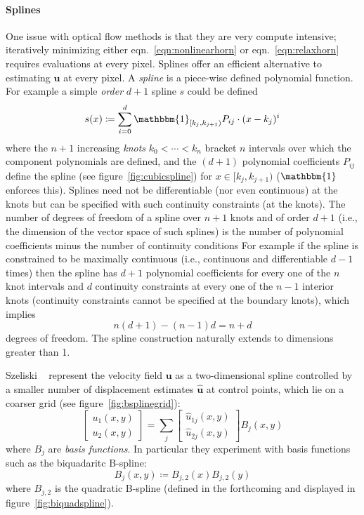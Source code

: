 \paragraph{Splines}

One issue with optical flow methods is that they are very compute intensive; iteratively minimizing either eqn.~\eqref{eqn:nonlinearhorn} or eqn.~\eqref{eqn:relaxhorn} requires evaluations at every pixel.
%
Splines offer an efficient alternative to estimating \(\mathbf{u}\) at every pixel.
%
A \textit{spline} is a piece-wise defined polynomial function. For example a simple \textit{order} \(d+1\) spline \(s\) could be defined
\[
		s(x) \coloneqq \sum_{i=0}^d \mathbbm{1}_{[k_j, k_{j+1})}P_{ij} \cdot (x - k_j)^i
\]
where the \(n+1\) increasing \textit{knots} \(k_0 < \cdots < k_n\) bracket \(n\) intervals over which the component polynomials are defined, and the \((d+1)\) polynomial coefficients \(P_{ij}\) define the spline (see figure~\ref{fig:cubicspline}) for \(x \in [k_j, k_{j+1})\) (\(\mathbbm{1}\) enforces this).
%
Splines need not be differentiable (nor even continuous) at the knots but can be specified with such continuity constraints (at the knots).
%
The number of degrees of freedom of a spline over \(n+1\) knots and of order \(d+1\) (i.e., the dimension of the vector space of such splines) is the number of polynomial coefficients minus the number of continuity conditions
%
For example if the spline is constrained to be maximally continuous (i.e., continuous and differentiable \(d-1\) times) then the spline has \(d+1\) polynomial coefficients for every one of the \(n\) knot intervals and \(d\) continuity constraints at every one of the \(n-1\) interior knots (continuity constraints cannot be specified at the boundary knots), which implies 
\[
	n(d+1) - (n-1)d = n+d
\]
degrees of freedom. The spline construction naturally extends to dimensions greater than 1.

Szeliski \etal~\cite{szeliski1997spline} represent the velocity field \(\mathbf{u}\) as a two-dimensional spline controlled by a smaller number of displacement estimates \(\hat{\mathbf{u}}\) at control points, which lie on a coarser grid (see figure~\ref{fig:bsplinegrid}):
%
\begin{equation}
	\begin{bmatrix}
		u_1(x,y) \\ u_2(x,y)
	\end{bmatrix} = \sum_j \begin{bmatrix}
		\hat{u}_{1j}(x,y) \\ \hat{u}_{2j}(x,y)
	\end{bmatrix} B_j(x, y)
\end{equation}
where \(B_j\) are \textit{basis functions}. 
%
In particular they experiment with basis functions such as the biquadaritc B-spline:
\[
	B_j(x,y) \coloneqq B_{j,2}(x) B_{j,2}(y)
\]
where \(B_{j,2}\) is the quadratic B-spline (defined in the forthcoming and displayed in figure~\ref{fig:biquadspline}).

